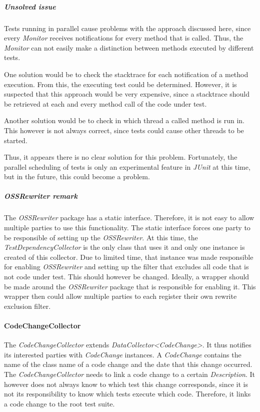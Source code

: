 \documentclass[i2]{oss}
\newcommand{\class}[1]{\emph{#1}}
\newcommand{\junit}{\emph{JUnit }}
\begin{document}
\subparagraph{Unsolved issue}

Tests running in parallel cause problems with the approach discussed here, since every \class{Monitor} receives notifications for every method that is called.
Thus, the \class{Monitor} can not easily make a distinction between methods executed by different tests.

One solution would be to check the stacktrace for each notification of a method execution. 
From this, the executing test could be determined.
However, it is suspected that this approach would be very expensive, since a stacktrace should be retrieved at each and every method call of the code under test.

Another solution would be to check in which thread a called method is run in.
This however is not always correct, since tests could cause other threads to be started.

Thus, it appears there is no clear solution for this problem.
Fortunately, the parallel scheduling of tests is only an experimental feature in \junit at this time, but in the future, this could become a problem.

\subparagraph{OSSRewriter remark}

The \class{OSSRewriter} package has a static interface.
Therefore, it is not easy to allow multiple parties to use this functionality.
The static interface forces one party to be responsible of setting up the \class{OSSRewriter}.
At this time, the \class{TestDependencyCollector} is the only class that uses it and only one instance is created of this collector.
Due to limited time, that instance was made responsible for enabling \class{OSSRewriter} and setting up the filter that excludes all code that is not code under test.
This should however be changed.
Ideally, a wrapper should be made around the \class{OSSRewriter} package that is responsible for enabling it.
This wrapper then could allow multiple parties to each register their own rewrite exclusion filter.

\paragraph{CodeChangeCollector}

The \class{CodeChangeCollector} extends \class{DataCollector<CodeChange>}.
It thus notifies its interested parties with \class{CodeChange} instances.
A \class{CodeChange} contains the name of the class name of a code change and the date that this change occurred.
The \class{CodeChangeCollector} needs to link a code change to a certain \class{Description}.
It however does not always know to which test this change corresponds, since it is not its responsibility to know which tests execute which code.
Therefore, it links a code change to the root test suite.
\end{document}
